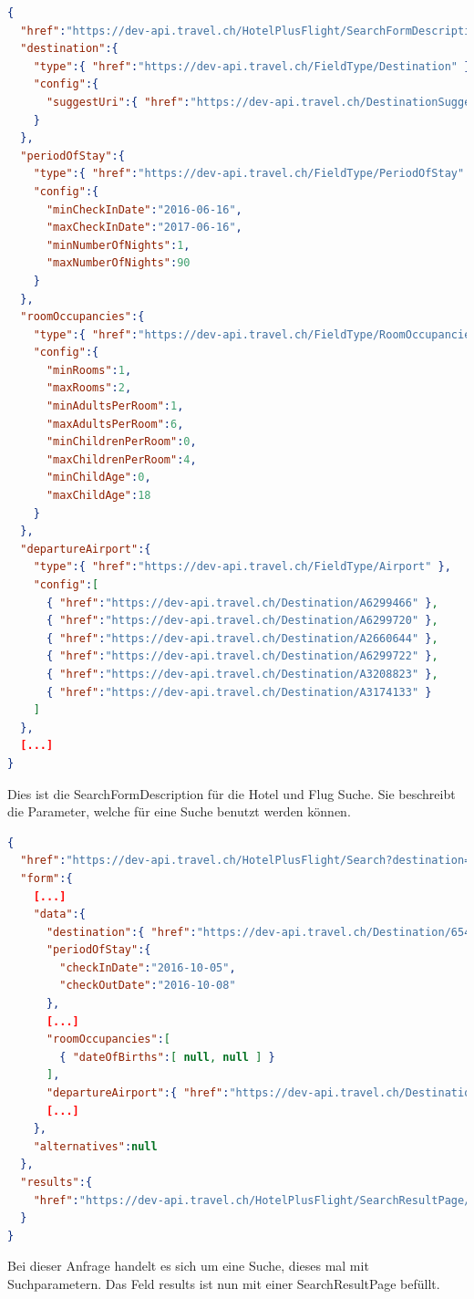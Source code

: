 \begin{lstlisting}[language=json,firstnumber=1]
{
  "href":"https://dev-api.travel.ch/HotelPlusFlight/SearchFormDescription/HotelPlusFligh",
  "destination":{
    "type":{ "href":"https://dev-api.travel.ch/FieldType/Destination" },
    "config":{
      "suggestUri":{ "href":"https://dev-api.travel.ch/DestinationSuggestions/HotelPlusFligh?q=%7B_%7D" }
    }
  },
  "periodOfStay":{
    "type":{ "href":"https://dev-api.travel.ch/FieldType/PeriodOfStay" },
    "config":{
      "minCheckInDate":"2016-06-16",
      "maxCheckInDate":"2017-06-16",
      "minNumberOfNights":1,
      "maxNumberOfNights":90
    }
  },
  "roomOccupancies":{
    "type":{ "href":"https://dev-api.travel.ch/FieldType/RoomOccupancies" },
    "config":{
      "minRooms":1,
      "maxRooms":2,
      "minAdultsPerRoom":1,
      "maxAdultsPerRoom":6,
      "minChildrenPerRoom":0,
      "maxChildrenPerRoom":4,
      "minChildAge":0,
      "maxChildAge":18
    }
  },
  "departureAirport":{
    "type":{ "href":"https://dev-api.travel.ch/FieldType/Airport" },
    "config":[
      { "href":"https://dev-api.travel.ch/Destination/A6299466" },
      { "href":"https://dev-api.travel.ch/Destination/A6299720" },
      { "href":"https://dev-api.travel.ch/Destination/A2660644" },
      { "href":"https://dev-api.travel.ch/Destination/A6299722" },
      { "href":"https://dev-api.travel.ch/Destination/A3208823" },
      { "href":"https://dev-api.travel.ch/Destination/A3174133" }
    ]
  },
  [...]
}
\end{lstlisting}
Dies ist die SearchFormDescription für die Hotel und Flug Suche. Sie beschreibt die Parameter, welche für eine Suche benutzt werden können.

\begin{lstlisting}[language=json,firstnumber=1]
{
  "href":"https://dev-api.travel.ch/HotelPlusFlight/Search?destination=https%3A%2F%2Fdev-api.travel.ch%2FDestination%2F6547539&periodOfStay.checkInDate=2016-10-05&periodOfStay.checkOutDate=2016-10-08&[...]",
  "form":{
    [...]
    "data":{
      "destination":{ "href":"https://dev-api.travel.ch/Destination/6547539" },
      "periodOfStay":{
        "checkInDate":"2016-10-05",
        "checkOutDate":"2016-10-08"
      },
      [...]
      "roomOccupancies":[
        { "dateOfBirths":[ null, null ] }
      ],
      "departureAirport":{ "href":"https://dev-api.travel.ch/Destination/A6299722" },
      [...]
    },
    "alternatives":null
  },
  "results":{
    "href":"https://dev-api.travel.ch/HotelPlusFlight/SearchResultPage/19E2B6BB-1F06-4396-B86E-169EDB368B0E?hotelCategories%5B0%5D=https%3A%2F%2Fdev-api.travel.ch%2FHotelCategory%2FNone[...]"
  }
}
\end{lstlisting}
Bei dieser Anfrage handelt es sich um eine Suche, dieses mal mit Suchparametern. Das Feld results ist nun mit einer SearchResultPage befüllt.

